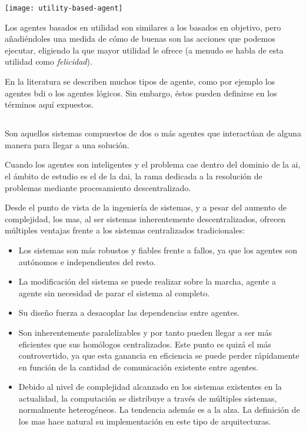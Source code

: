 \begin{marginfigure}
	\texttt{[image: utility-based-agent]}
	\caption[Esquema de agente basado en utilidad]{Los agentes basados en utilidad son similares a los basados en objetivo, pero añadiéndoles una medida de cómo de buenas son las acciones que podemos ejecutar, eligiendo la que mayor utilidad le ofrece (a menudo se habla de esta utilidad como \textit{felicidad}).}
	\label{fig:utility-based-agent}
\end{marginfigure}

En la literatura se describen muchos tipos de agente, como por ejemplo los agentes \gls{bdi} o los agentes lógicos. Sin embargo, éstos pueden definirse en los términos aquí expuestos. 

\subsection{}

Son aquellos sistemas compuestos de dos o más agentes que interactúan de alguna manera para llegar a una solución.

Cuando los agentes son inteligentes y el problema cae dentro del dominio de la \gls{ai}, el ámbito de estudio es el de la \gls{dai}, la rama dedicada a la resolución de problemas mediante procesamiento descentralizado.

Desde el punto de vista de la ingeniería de sistemas, y a pesar del aumento de complejidad, los \gls{mas}, al ser sistemas inherentemente descentralizados, ofrecen múltiples ventajas frente a los sistemas centralizados tradicionales:

\begin{itemize}
	\item Los sistemas son más robustos y fiables frente a fallos, ya que los agentes son autónomos e independientes del resto.
	\item La modificación del sistema se puede realizar sobre la marcha, agente a agente sin necesidad de parar el sistema al completo.
	\item Su diseño fuerza a desacoplar las dependencias entre agentes.
	\item Son inherentemente paralelizables y por tanto pueden llegar a ser más eficientes que sus homólogos centralizados. Este punto es quizá el más controvertido, ya que esta ganancia en eficiencia se puede perder rápidamente en función de la cantidad de comunicación existente entre agentes.
	\item Debido al nivel de complejidad alcanzado en los sistemas existentes en la actualidad, la computación se distribuye a través de múltiples sistemas, normalmente heterogéneos. La tendencia además es a la alza. La definición de los \gls{mas} hace natural su implementación en este tipo de arquitecturas.
\end{itemize}

